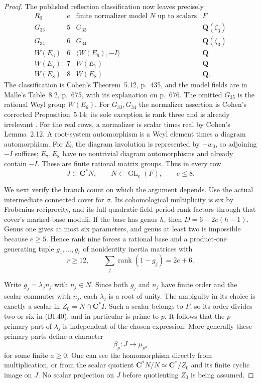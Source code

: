 \begin{proof}
The published reflection classification now leaves precisely
\[
\begin{array}{c|c|c|c}
 R_0&e&\text{finite normalizer model }N\text{ up to scalars}&F\\\hline
 G_{33}&5&G_{33}&\mathbf Q(\zeta_3)\\
 G_{34}&6&G_{34}&\mathbf Q(\zeta_3)\\
 W(E_6)&6&\langle W(E_6),-I\rangle&\mathbf Q\\
 W(E_7)&7&W(E_7)&\mathbf Q\\
 W(E_8)&8&W(E_8)&\mathbf Q.
\end{array}                                                    \tag{BI.40}
\]
The classification is Cohen's Theorem~5.12, p.~435, and the
model fields are in Malle's Table~8.2, p.~675, with its explanation
on p.~676.  The omitted $G_{35}$ is the rational Weyl group
$W(E_6)$.  For $G_{33},G_{34}$ the normalizer assertion is
Cohen's corrected Proposition~5.14; its sole exception is rank
three and is already irrelevant
\cite{FIELD:Cohen,FIELD:CohenErr,FIELD:Malle}.
For the real rows, a normalizer is scalar times real by
Cohen's Lemma~2.12.  A root-system automorphism is a Weyl element
times a diagram automorphism.  For $E_6$ the diagram involution
is represented by $-w_0$, so adjoining $-I$ suffices; $E_7,E_8$
have no nontrivial diagram automorphisms and already contain
$-I$.  These are finite rational matrix groups.  Thus in every
row
\[
                    J\subset\mathbf C^*N,
                    \qquad N\subset\operatorname{GL}_e(F),
                    \qquad e\le8.                          \tag{BI.41}
\]

We next verify the branch count on which the argument depends.
Use the actual intermediate connected cover for $\sigma$.
Its cohomological multiplicity is six by Frobenius reciprocity,
and its full quadratic-field period rank factors through that
cover's marked-base moduli.  If the base has genus $h$, then
$D=6-2e(h-1)$.  Genus one gives at most six parameters, and
genus at least two is impossible because $e\ge5$.  Hence rank
nine forces a rational base and a product-one generating tuple
$g_1,\ldots,g_r$ of nonidentity inertia matrices with
\[
                  r\ge12,
                  \qquad\sum_j\operatorname{rank}(1-g_j)=2e+6.
                                                               \tag{BI.42}
\]

Write $g_j=\lambda_j n_j$ with $n_j\in N$.  Since both $g_j$
and $n_j$ have finite order and the scalar commutes with $n_j$,
each $\lambda_j$ is a root of unity.  The ambiguity in its choice
is exactly a scalar in $Z_0=N\cap\mathbf C^*I$.  Such a scalar
belongs to $F$, so its order divides two or six in (BI.40), and
in particular is prime to $p$.
It follows that the $p$-primary part of $\lambda_j$ is independent
of the chosen expression.  More generally these primary parts
define a character
\[
              \beta_p:J\longrightarrow\mu_{p^a}
                                                               \tag{BI.43}
\]
for some finite $a\ge0$.  One can see the homomorphism directly
from multiplication, or from the scalar quotient
$\mathbf C^*N/N\simeq\mathbf C^*/Z_0$ and its finite cyclic
image on $J$.  No scalar projection on $J$ before quotienting
$Z_0$ is being assumed.


\end{proof}

